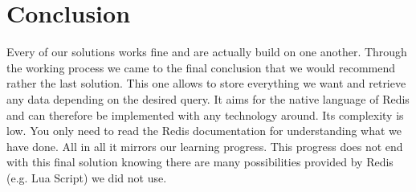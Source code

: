 \chapter{Conclusion}
Every of our solutions works fine and are actually build on one another. Through the working process we came to the final conclusion that we would recommend rather the last solution. This one allows to store everything we want and retrieve any data depending on the desired query. It aims for the native language of Redis and can therefore be implemented with any technology around. Its complexity is low. You only need to read the Redis documentation for understanding what we have done. All in all it mirrors our learning progress. This progress does not end with this final solution knowing there are many possibilities provided by Redis (e.g. Lua Script) we did not use. 
